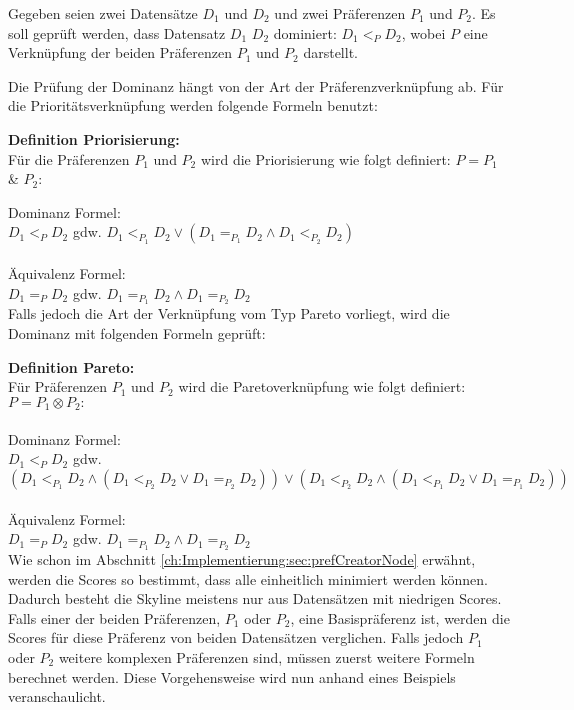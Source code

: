 Gegeben seien zwei Datensätze $D_1$ und $D_2$ und zwei Präferenzen $P_1$ und $P_2$.
Es soll geprüft werden, dass Datensatz $D_1$ $D_2$ dominiert: $D_1 <_P D_2$, wobei $P$ eine Verknüpfung der beiden Präferenzen $P_1$ und $P_2$ darstellt.

Die Prüfung der Dominanz hängt von der Art der Präferenzverknüpfung ab. Für die Prioritätsverknüpfung werden folgende Formeln benutzt:

\textbf{Definition Priorisierung:} \\
Für die Präferenzen $P_1$ und $P_2$ wird die Priorisierung wie folgt definiert: $P = P_1$ \& $P_2:$

Dominanz Formel: \\
$D_1 <_P D_2$ gdw. $D_1 <_{P_1} D_2 \lor (D_1 =_{P_1} D_2 \land D_1 <_{P_2} D_2)$ \\ \\
Äquivalenz Formel: \\
$D_1 =_P D_2$ gdw. $D_1 =_{P_1} D_2 \land D_1 =_{P_2} D_2$ \\

Falls jedoch die Art der Verknüpfung vom Typ Pareto vorliegt, wird die Dominanz mit folgenden Formeln geprüft:

\textbf{Definition Pareto:} \\
Für Präferenzen $P_1$ und $P_2$ wird die Paretoverknüpfung wie folgt definiert: $P = P_1 \otimes P_2:$ \\ \\
Dominanz Formel:\\
$D_1  <_P D_2$ gdw. $(D_1 <_{P_1} D_2 \land (D_1 <_{P_2} D_2 \lor D_1 =_{P_2} D_2)) \lor (D_1 <_{P_2} D_2 \land (D_1 <_{P_1} D_2 \lor D_1 =_{P_1} D_2))$ \\ \\
Äquivalenz Formel: \\
$D_1 =_P D_2$ gdw. $D_1 =_{P_1} D_2 \land D_1 =_{P_2} D_2$ \\

Wie schon im Abschnitt \ref{ch:Implementierung:sec:prefCreatorNode} erwähnt, werden die Scores so bestimmt, dass alle einheitlich minimiert werden können. Dadurch besteht die Skyline meistens nur aus Datensätzen mit niedrigen Scores. Falls einer der beiden Präferenzen, $P_1$ oder $P_2$, eine Basispräferenz ist, werden die Scores für diese Präferenz von beiden Datensätzen verglichen. Falls jedoch $P_1$ oder $P_2$ weitere komplexen Präferenzen sind, müssen zuerst weitere Formeln berechnet werden. Diese Vorgehensweise wird nun anhand eines Beispiels veranschaulicht.

